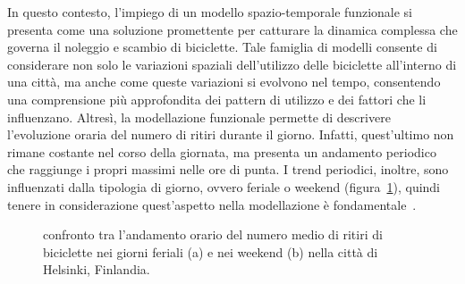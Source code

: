 \par In questo contesto, l'impiego di un modello spazio-temporale funzionale si presenta come una soluzione promettente per catturare la dinamica complessa che governa il noleggio e scambio di biciclette. Tale famiglia di modelli consente di considerare non solo le variazioni spaziali dell'utilizzo delle biciclette all'interno di una città, ma anche come queste variazioni si evolvono nel tempo, consentendo una comprensione più approfondita dei pattern di utilizzo e dei fattori che li influenzano. Altresì, la modellazione funzionale permette di descrivere l'evoluzione oraria del numero di ritiri durante il giorno. Infatti, quest'ultimo non rimane costante nel corso della giornata, ma presenta un andamento periodico che raggiunge i propri massimi nelle ore di punta. I trend periodici, inoltre, sono influenzati dalla tipologia di giorno, ovvero feriale o weekend (figura~\ref{trend_paper_Otto}), quindi tenere in considerazione quest'aspetto nella modellazione è fondamentale~\citep{paper_bike_sharing_Otto}.

\begin{figure}[htpb]
	\centering
	\quad
	\quad
	\caption[Confronto tra l'andamento orario del numero medio di ritiri nei giorni feriali e nei weekend a Helsinki]{confronto tra l'andamento orario del numero medio di ritiri di biciclette nei giorni feriali (a) e nei weekend (b) nella città di Helsinki, Finlandia.}
	\label{trend_paper_Otto}
\end{figure}

